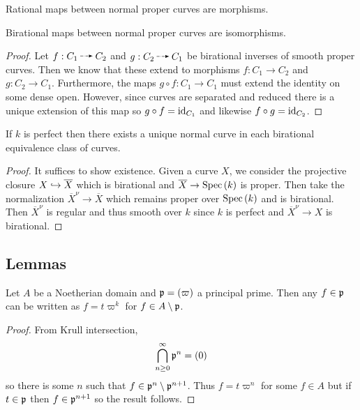 \documentclass[12pt]{article}
\begin{document}
\begin{cor}
Rational maps between normal proper curves are morphisms.
\end{cor}

\begin{cor}
Birational maps between normal proper curves are isomorphisms.
\end{cor}

\begin{proof}
Let $f : C_1 \rat C_2$ and $g : C_2 \rat C_1$ be birational inverses of smooth proper curves. Then we know that these extend to morphisms $f : C_1 \to C_2$ and $g : C_2 \to C_1$. Furthermore, the maps $g \circ f : C_1 \to C_1$ must extend the identity on some dense open. However, since curves are separated and reduced there is a unique extension of this map so $g \circ f = \mathrm{id}_{C_1}$ and likewise $f \circ g = \mathrm{id}_{C_2}$. 
\end{proof}

\begin{thm}
If $k$ is perfect then there exists a unique normal curve in each birational equivalence class of curves.
\end{thm}

\begin{proof}
It suffices to show existence. Given a curve $X$, we consider the projective closure $X \hookrightarrow \overline{X}$ which is birational and $\overline{X} \to \mathrm{Spec}\left( k \right)$ is proper. Then take the normalization $\overline{X}^\nu \to \overline{X}$ which remains proper over $\mathrm{Spec}\left( k \right)$ and is birational. Then $\overline{X}^\nu$ is regular and thus smooth over $k$ since $k$ is perfect and $\overline{X}^\nu \to X$ is birational.
\end{proof}

\subsection{Lemmas}

\begin{lemma} \label{principal_ideal_powers}
Let $A$ be a Noetherian domain and $\mathfrak{p} = (\varpi)$ a principal prime. Then any $f \in \mathfrak{p}$ can be written as $f = t \varpi^k$ for $f \in A \setminus \mathfrak{p}$. 
\end{lemma}

\begin{proof}
From Krull intersection,
\[ \bigcap_{n \ge 0}^\infty \mathfrak{p}^n = (0) \]
so there is some $n$ such that $f \in \mathfrak{p}^n \setminus \mathfrak{p}^{n+1}$. Thus $f = t \varpi^n$ for some $f \in A$ but if $t \in \mathfrak{p}$ then $f \in \mathfrak{p}^{n+1}$ so the result follows.
\end{proof}
\end{document}

